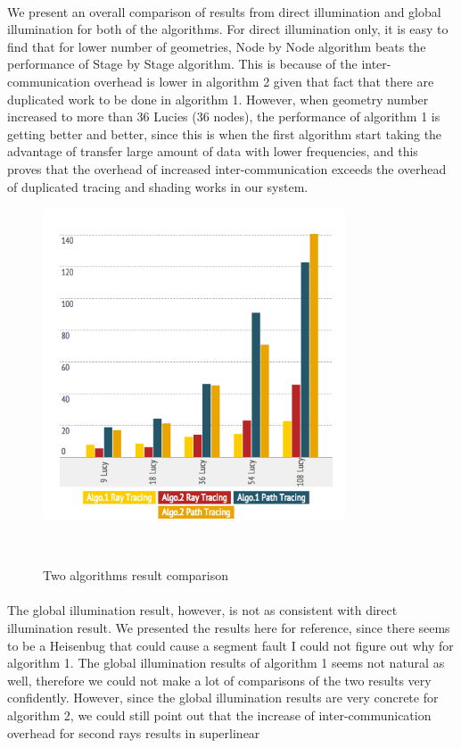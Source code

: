 \documentclass[a4paper, oneside, 10pt]{article}
\begin{document}
\paragraph{}We present an overall comparison of results from direct illumination and global illumination for both of the algorithms. For direct illumination only, it is easy to find that for lower number of geometries, Node by Node algorithm beats the performance of Stage by Stage algorithm. This is because of the inter-communication overhead is lower in algorithm 2 given that fact that there are duplicated work to be done in algorithm 1. However, when geometry number increased to more than 36 Lucies (36 nodes), the performance of algorithm 1 is getting better and better, since this is when the first algorithm start taking the advantage of transfer large amount of data with lower frequencies, and this proves that the overhead of increased inter-communication exceeds the overhead of duplicated tracing and shading works in our system.
\begin{figure}[h]
\centering
\includegraphics[width=0.8\textwidth]{res2}
\caption{Two algorithms result comparison}\
\end{figure}
\paragraph{}The global illumination result, however, is not as consistent with direct illumination result. We presented the results here for reference, since there seems to be a Heisenbug that could cause a segment fault I could not figure out why for algorithm 1. The global illumination results of algorithm 1 seems not natural as well, therefore we could not make a lot of comparisons of the two results very confidently. However, since the global illumination results are very concrete for algorithm 2, we could still point out that the increase of inter-communication overhead for second rays results in superlinear 
\newpage
\end{document}
